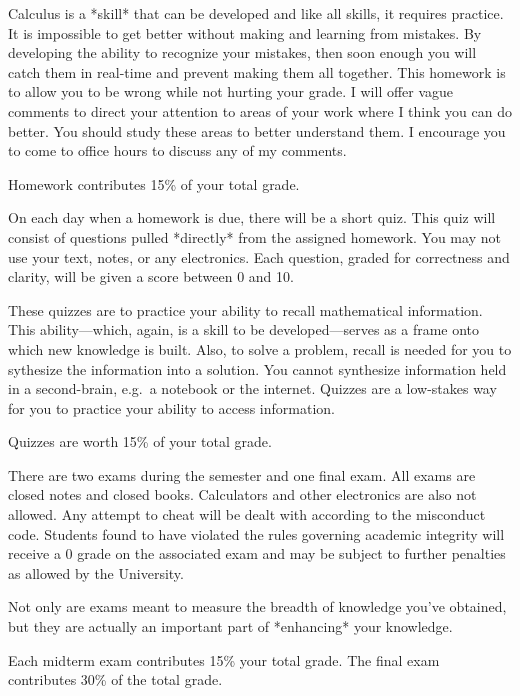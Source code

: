 \documentclass{assets/syllabus}
\begin{document}
Calculus is a *skill* that can be developed and like all
skills, it requires practice.  It is impossible to get
better without making and learning from mistakes.  By
developing the ability to recognize your mistakes, then soon
enough you will catch them in real-time and prevent making
them all together. This homework is to allow you to be wrong
while not hurting your grade.  I will offer vague comments
to direct your attention to areas of your work where I think
you can do better. You should study these areas to better
understand them. I encourage you to come to office hours to
discuss any of my comments.

Homework contributes 15\% of your total grade.



On each day when a homework is due, there will be a short
quiz. This quiz will consist of questions pulled *directly*
from the assigned homework. You may not use your text,
notes, or any electronics. Each question, graded for
correctness and clarity, will be given a score between 0 and
10.

These quizzes are to practice your ability to recall
mathematical information. This ability---which, again, is a
skill to be developed---serves as a frame onto which new
knowledge is built.  Also, to solve a problem, recall is needed
for you to sythesize the information into a solution.  You
cannot synthesize information held in a second-brain, e.g.~a
notebook or the internet. Quizzes are a low-stakes way for
you to practice your ability to access information.

Quizzes are worth 15\% of your total grade.


There are two exams during the semester and one final
exam. All exams are closed notes and closed
books. Calculators and other electronics are also not
allowed. Any attempt to cheat will be dealt with according
to the misconduct code.  Students found to have violated
the rules governing academic integrity will receive a 0
grade on the associated exam and may be subject to further
penalties as allowed by the University.

Not only are exams meant to measure the breadth of knowledge
you've obtained, but they are actually an important part of
*enhancing* your knowledge. 

Each midterm exam contributes 15\% your total grade.  The
final exam contributes 30\% of the total grade. 
\end{document}
